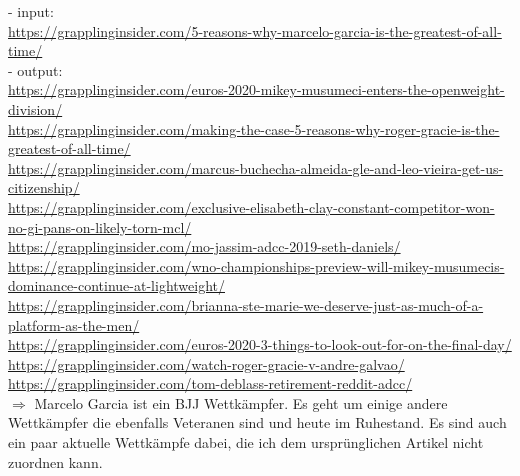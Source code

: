 \noindent- input: \\
{\color{MidnightBlue}
\url{https://grapplinginsider.com/5-reasons-why-marcelo-garcia-is-the-greatest-of-all-time/}} \\
\noindent- output: \\
{\color{MidnightBlue}
\url{https://grapplinginsider.com/euros-2020-mikey-musumeci-enters-the-openweight-division/} \\
\url{https://grapplinginsider.com/making-the-case-5-reasons-why-roger-gracie-is-the-greatest-of-all-time/} \\
\url{https://grapplinginsider.com/marcus-buchecha-almeida-gle-and-leo-vieira-get-us-citizenship/} \\
\url{https://grapplinginsider.com/exclusive-elisabeth-clay-constant-competitor-won-no-gi-pans-on-likely-torn-mcl/} \\
\url{https://grapplinginsider.com/mo-jassim-adcc-2019-seth-daniels/} \\
\url{https://grapplinginsider.com/wno-championships-preview-will-mikey-musumecis-dominance-continue-at-lightweight/} \\
\url{https://grapplinginsider.com/brianna-ste-marie-we-deserve-just-as-much-of-a-platform-as-the-men/} \\
\url{https://grapplinginsider.com/euros-2020-3-things-to-look-out-for-on-the-final-day/} \\
\url{https://grapplinginsider.com/watch-roger-gracie-v-andre-galvao/} \\
\url{https://grapplinginsider.com/tom-deblass-retirement-reddit-adcc/}} \\

\noindent$\Rightarrow$ Marcelo Garcia ist ein BJJ Wettkämpfer. Es geht um einige andere Wettkämpfer die ebenfalls Veteranen sind und heute im Ruhestand. Es sind auch ein paar aktuelle Wettkämpfe dabei, die ich dem ursprünglichen Artikel nicht zuordnen kann. \\

